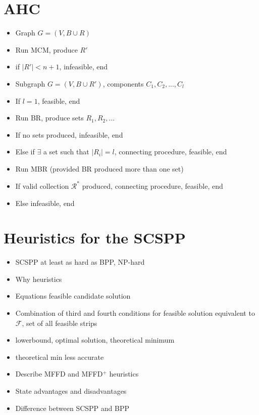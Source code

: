 \documentclass{elsarticle}
\begin{document}
\section{AHC}
\begin{itemize}
	\item Graph $G = (V, B \cup R)$
	\item Run MCM, produce $R'$
	\item if $|R'| < n+1$, infeasible, end
	\item Subgraph $G = (V, B \cup R')$, components $C_1, C_2,...,C_l$
	\item If $l = 1$, feasible, end
	\item Run BR, produce sets $R_1, R_2,...$
	\item If no sets produced, infeasible, end
	\item Else if $\exists$ a set such that $|R_i| = l$, connecting procedure, feasible, end
	\item Run MBR (provided BR produced more than one set)
	\item If valid collection $\mathcal{R}^*$ produced, connecting procedure, feasible, end
	\item Else infeasible, end
\end{itemize}

\section{Heuristics for the SCSPP}
\begin{itemize}
	\item SCSPP at least as hard as BPP, NP-hard
	\item Why heuristics
	\item Equations feasible candidate solution
	\item Combination of third and fourth conditions for feasible solution equivalent to $\mathcal{F}$, set of all feasible strips
	\item lowerbound, optimal solution, theoretical minimum
	\item theoretical min less accurate
	\item Describe MFFD and MFFD$^+$ heuristics
	\item State advantages and disadvantages
	\item Difference between SCSPP and BPP
\end{itemize}
\end{document}
